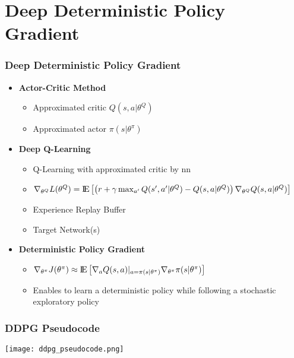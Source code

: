 \documentclass[accentcolor=tud1d,colorbacktitle,inverttitle,landscape,german,presentation,t]{tudbeamer}
\begin{document}
\section{Deep Deterministic Policy Gradient}
	\begin{frame}
		\frametitle{Deep Deterministic Policy Gradient}
		\begin{itemize}
			\item \textbf{Actor-Critic Method}
			\begin{itemize}
				\item Approximated critic $Q(s,a|\theta^Q)$
				\item Approximated actor $\pi(s|\theta^\pi)$
			\end{itemize}
			\item \textbf{Deep Q-Learning}
			\begin{itemize}
				\item Q-Learning with approximated critic by nn
				\item $\nabla_{\theta^Q}L(\theta^Q)={\rm I\!E} \left[\left(r+\gamma \max_{a'} Q(s', 
				a'|\theta^Q)-Q(s,a|\theta^Q)\right)\nabla_{\theta^Q}Q(s,a|\theta^Q)\right] $
				\item Experience Replay Buffer
				\item Target Network(s)
			\end{itemize}
			\item \textbf{Deterministic Policy Gradient}
			\begin{itemize}
				\item $\nabla_{\theta^\pi}J(\theta^\pi)\approx {\rm I\!E}\left[\nabla_aQ(s,a)|_{a=\pi(s|\theta^\pi)} \nabla_{\theta^\pi}\pi(s|\theta^\pi)\right]$
				\item Enables to learn a deterministic policy while following a stochastic exploratory policy
			\end{itemize}
		\end{itemize}
	\end{frame}
	\begin{frame}
		\frametitle{DDPG Pseudocode}
		\texttt{[image: ddpg\_pseudocode.png]}
	\end{frame}
\end{document}

